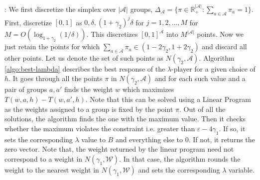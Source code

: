 \documentclass{article}
\newcommand{\set}[1]{\{#1\}}
\newcommand{\bbR}{\mathbb{R}}
\newcommand{\WW}{\mathcal{W}}
\newcommand{\abs}[1]{\left|#1\right|}
\newcommand{\Ac}{\mathcal{A}}
\newcommand{\eps}{\varepsilon}
\begin{document}
: We first discretize the simplex over $\abs{\Ac}$ groups, $\Delta_{\Ac} = \set{\pi \in \bbR^{\abs{\Ac}}_+: \sum_{a \in \Ac} \pi_a = 1}$. First, discretize $[0,1]$ as $0,\delta, (1+\gamma_2)^j \delta$ for $j=1,2,\ldots,M$ for $M = O(\log_{1+\gamma_2}(1/\delta))$. This discretizes $[0,1]^{\Ac}$ into $M^{\abs{\Ac} }$ points. Now we just retain the points for which $\sum_{a\in \Ac} \pi_a \in (1-2\gamma_2,1+2\gamma_2)$ and discard all other points. Let us denote the set of such points as $N(\gamma_2,\Ac)$. Algorithm \ref{algo:best-lambda} describes the best response of the $\lambda$-player for a given choice of $h$. It goes through all the points $\pi$ in $N(\gamma_2,\Ac)$ and for each such value and a pair of groups $a,a'$ finds the weight $w$ which maximizes $T(w,a,h) - T(w,a',h)$. Note that this can be solved using a Linear Program as the weights assigned to a group is fixed by the point $\pi$. Out of all the solutions, the algorithm finds the one with the maximum value. Then it checks whether the maximum violates the constraint i.e. greater than $\eps - 4\gamma_1$. If so, it sets the corresponding $\lambda$ value to $B$ and everything else to $0$. If not, it returns the zero vector. Note that, the weight returned by the linear program need not correspond to a weight in $N(\gamma_1, \WW)$. In that case, the algorithm rounds the weight to the nearest weight in $N(\gamma_1,\WW)$ and sets the corresponding $\lambda$ variable.
\end{document}
